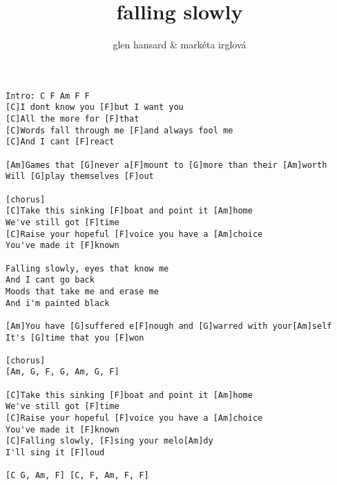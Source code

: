 \author{glen hansard \& markéta irglová}
\title{falling slowly}
\maketitle
\begin{verbatim}
Intro: C F Am F F
[C]I dont know you [F]but I want you
[C]All the more for [F]that
[C]Words fall through me [F]and always fool me
[C]And I cant [F]react

[Am]Games that [G]never a[F]mount to [G]more than their [Am]worth
Will [G]play themselves [F]out

[chorus]
[C]Take this sinking [F]boat and point it [Am]home
We've still got [F]time
[C]Raise your hopeful [F]voice you have a [Am]choice
You've made it [F]known

Falling slowly, eyes that know me
And I cant go back
Moods that take me and erase me
And i'm painted black

[Am]You have [G]suffered e[F]nough and [G]warred with your[Am]self
It's [G]time that you [F]won

[chorus]
[Am, G, F, G, Am, G, F]

[C]Take this sinking [F]boat and point it [Am]home
We've still got [F]time
[C]Raise your hopeful [F]voice you have a [Am]choice
You've made it [F]known
[C]Falling slowly, [F]sing your melo[Am]dy
I'll sing it [F]loud

[C G, Am, F] [C, F, Am, F, F]
\end{verbatim}